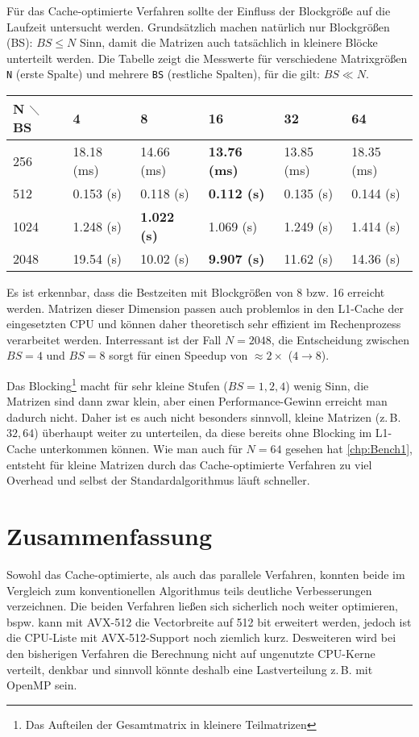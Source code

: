 \documentclass[a4paper,11pt]{scrartcl}
\newcommand{\zB}{\mbox{z.\,B.}\xspace}
\newcommand{\bspw}{\mbox{bspw.}\xspace}
\newcommand{\bzw}{\mbox{bzw.}\xspace}
\begin{document}
Für das Cache-optimierte Verfahren sollte der Einfluss der Blockgröße auf die Laufzeit
untersucht werden. Grundsätzlich machen natürlich nur Blockgrößen (BS): $BS \leq N$
Sinn, damit die Matrizen auch tatsächlich in kleinere Blöcke unterteilt werden.
Die Tabelle zeigt die Messwerte für verschiedene Matrixgrößen \texttt{N} (erste Spalte)
und mehrere \texttt{BS} (restliche Spalten), für die gilt: $BS \ll N$.\newline

\begin{tabular}{| l | l | l | l | l | l |}
\hline
N $\diagdown$ BS & 4 & 8 & 16 & 32 & 64  \\ \hline

256 & 18.18 (ms) & 14.66 (ms) & \textbf{13.76 (ms)} & 13.85 (ms) & 18.35 (ms)  \\ \hline
512 & 0.153 (s) & 0.118 (s) & \textbf{0.112 (s)} & 0.135 (s) & 0.144 (s)  \\ \hline
1024 & 1.248 (s) & \textbf{1.022 (s)} & 1.069 (s) & 1.249 (s) & 1.414 (s)  \\ \hline
2048 & 19.54 (s) & 10.02 (s) & \textbf{9.907 (s)} & 11.62 (s) & 14.36 (s)  \\ \hline
\end{tabular}\newline

Es ist erkennbar, dass die Bestzeiten mit Blockgrößen von 8 \bzw 16 erreicht werden.
Matrizen dieser Dimension passen auch problemlos in den L1-Cache der eingesetzten CPU
und können daher theoretisch sehr effizient im Rechenprozess verarbeitet werden.
Interressant ist der Fall $N=2048$, die Entscheidung zwischen $BS=4$ und $BS=8$
sorgt für einen Speedup von $\approx 2\times$ ($4\rightarrow8$).\newline

Das Blocking\footnote{Das Aufteilen der Gesamtmatrix in kleinere Teilmatrizen} macht für
sehr kleine Stufen ($BS=1,2,4$)  wenig Sinn, die Matrizen sind dann zwar klein, aber
einen Performance-Gewinn erreicht man dadurch nicht. Daher ist es auch nicht besonders sinnvoll,
kleine Matrizen (\zB $32,64$) überhaupt weiter zu unterteilen, da diese bereits ohne Blocking
im L1-Cache unterkommen können. Wie man auch für $N=64$ gesehen hat \ref{chp:Bench1}, 
entsteht für kleine 
Matrizen durch das Cache-optimierte Verfahren zu viel Overhead und selbst der
Standardalgorithmus läuft schneller.

\section{Zusammenfassung}
Sowohl das Cache-optimierte, als auch das parallele Verfahren, konnten beide
im Vergleich zum konventionellen Algorithmus teils deutliche Verbesserungen verzeichnen.
Die beiden Verfahren ließen sich sicherlich noch weiter optimieren, \bspw
kann mit AVX-512 die Vectorbreite auf 512 bit erweitert werden, jedoch ist die
CPU-Liste mit AVX-512-Support noch ziemlich kurz. Desweiteren wird bei den bisherigen Verfahren
die Berechnung nicht auf ungenutzte CPU-Kerne verteilt, denkbar und sinnvoll könnte
deshalb eine Lastverteilung \zB mit OpenMP sein.\newline
 
\end{document}
